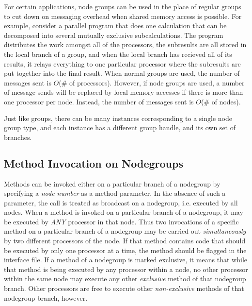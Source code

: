 For certain applications, node groups can be used in the place of
regular groups to cut down on messaging overhead when shared memory
access is possible.  For example, consider a parallel program that
does one calculation that can be decomposed into several mutually
exclusive subcalculations.  The program distributes the work amongst
all of the processors, the subresults are all stored in the local
branch of a group, and when the local branch has recieved all of its
results, it relays everything to one particular processor where the
subresults are put together into the final result.  When normal groups
are used, the number of messages sent is $O$(\# of processors).
However, if node groups are used, a number of message sends will be
replaced by local memory accesses if there is more than
one processor per node.  Instead, the number of messages sent is
$O$(\# of nodes).

Just like groups, there can be many instances corresponding to a single node
group type, and each instance has a different group handle, and its own set of
branches.


\subsection{Method Invocation on Nodegroups}

Methods can be invoked either on a particular branch
of a nodegroup by specifying a {\em node number} as a method
parameter. In the absence of such a parameter, the call is treated as broadcast
on a nodegroup, i.e. executed by all nodes. When a method is
invoked on a particular branch of a nodegroup,
it may be executed by {\em ANY} processor in that node. Thus two invocations of
a specific method on a particular branch of a
nodegroup may be carried out {\em simultaneously} by two
different processors of the node. If that method contains code that
should be executed by only one processor at a time, the method should
be flagged
 in the interface file. If a method  of a
nodegroup  is marked exclusive, it means that while that method is being
executed by any processor within a node, no other processor within the same
node may execute any other {\em exclusive} method of that
nodegroup branch.  Other processors are free to
execute other {\em non-exclusive} methods of that nodegroup
branch, however.


